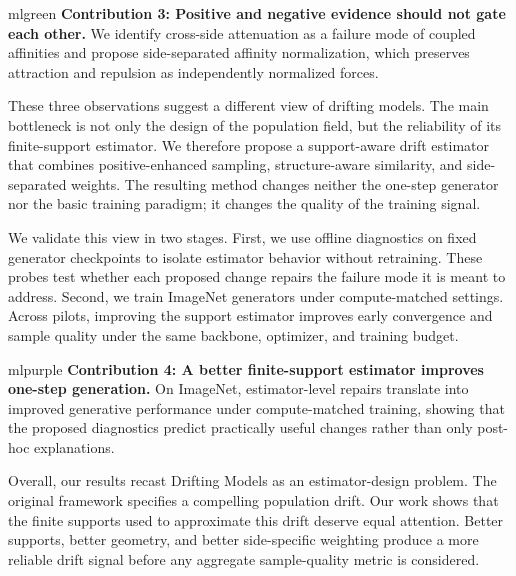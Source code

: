 \documentclass{article}
\begin{document}
\begin{contributionbox}{mlgreen}
\textbf{Contribution 3: Positive and negative evidence should not gate each other.}
We identify cross-side attenuation as a failure mode of coupled affinities and propose side-separated affinity normalization, which preserves attraction and repulsion as independently normalized forces.
\end{contributionbox}

These three observations suggest a different view of drifting models.
The main bottleneck is not only the design of the population field, but the reliability of its finite-support estimator.
We therefore propose a support-aware drift estimator that combines positive-enhanced sampling, structure-aware similarity, and side-separated weights.
The resulting method changes neither the one-step generator nor the basic training paradigm; it changes the quality of the training signal.

We validate this view in two stages.
First, we use offline diagnostics on fixed generator checkpoints to isolate estimator behavior without retraining.
These probes test whether each proposed change repairs the failure mode it is meant to address.
Second, we train ImageNet generators under compute-matched settings.
Across pilots, improving the support estimator improves early convergence and sample quality under the same backbone, optimizer, and training budget.

\begin{contributionbox}{mlpurple}
\textbf{Contribution 4: A better finite-support estimator improves one-step generation.}
On ImageNet, estimator-level repairs translate into improved generative performance under compute-matched training, showing that the proposed diagnostics predict practically useful changes rather than only post-hoc explanations.
\end{contributionbox}

Overall, our results recast Drifting Models as an estimator-design problem.
The original framework specifies a compelling population drift.
Our work shows that the finite supports used to approximate this drift deserve equal attention.
Better supports, better geometry, and better side-specific weighting produce a more reliable drift signal before any aggregate sample-quality metric is considered.

\end{document}
